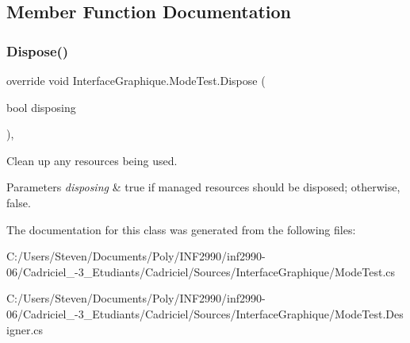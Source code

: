 \subsection{Member Function Documentation}
\hypertarget{class_interface_graphique_1_1_mode_test_a06f68e45851d96953a8413bd1d85a59c}{}\label{class_interface_graphique_1_1_mode_test_a06f68e45851d96953a8413bd1d85a59c} 
\subsubsection{\texorpdfstring{Dispose()}{Dispose()}}
{\footnotesize\ttfamily override void Interface\+Graphique.\+Mode\+Test.\+Dispose (\begin{DoxyParamCaption}\item[{bool}]{disposing }\end{DoxyParamCaption})\hspace{0.3cm}{\ttfamily [inline]}, {\ttfamily [protected]}}



Clean up any resources being used. 


\begin{DoxyParams}{Parameters}
{\em disposing} & true if managed resources should be disposed; otherwise, false.\\
\hline
\end{DoxyParams}


The documentation for this class was generated from the following files\+:\begin{DoxyCompactItemize}
\item 
C\+:/\+Users/\+Steven/\+Documents/\+Poly/\+I\+N\+F2990/inf2990-\/06/\+Cadriciel\+\_-\/3\+\_\+\+Etudiants/\+Cadriciel/\+Sources/\+Interface\+Graphique/Mode\+Test.\+cs\item 
C\+:/\+Users/\+Steven/\+Documents/\+Poly/\+I\+N\+F2990/inf2990-\/06/\+Cadriciel\+\_-\/3\+\_\+\+Etudiants/\+Cadriciel/\+Sources/\+Interface\+Graphique/Mode\+Test.\+Designer.\+cs\end{DoxyCompactItemize}
